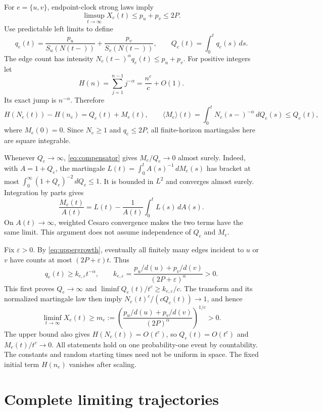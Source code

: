 \documentclass[11pt,a4paper]{article}
\begin{document}
For $e=\{u,v\}$, endpoint-clock strong laws imply
\begin{equation}\label{eq:uppergrowth}
 \limsup_{t\to\infty}X_e(t)\leq p_u+p_v\leq2P.
\end{equation}
Use predictable left limits to define
\[
 q_e(t)=\frac{p_u}{S_u(N(t-))}+\frac{p_v}{S_v(N(t-))},\qquad
 Q_e(t)=\int_0^t q_e(s)\,ds.
\]
The edge count has intensity $N_e(t-)^\alpha q_e(t)\leq p_u+p_v$.
For positive integers let
\[
 H(n)=\sum_{j=1}^{n-1}j^{-\alpha}=\frac{n^c}{c}+O(1).
\]
Its exact jump is $n^{-\alpha}$. Therefore
\begin{equation}\label{eq:compensator}
 H(N_e(t))-H(n_e)=Q_e(t)+M_e(t),\qquad
 \langle M_e\rangle(t)=\int_0^t N_e(s-)^{-\alpha}\,dQ_e(s)\leq Q_e(t),
\end{equation}
where $M_e(0)=0$. Since $N_e\geq1$ and $q_e\leq2P$, all finite-horizon
martingales here are square integrable.

Whenever $Q_e\to\infty$, \eqref{eq:compensator} gives $M_e/Q_e\to0$ almost
surely. Indeed, with $A=1+Q_e$, the martingale
$L(t)=\int_0^t A(s)^{-1}\,dM_e(s)$ has bracket at most
$\int_0^\infty(1+Q_e)^{-2}\,dQ_e\leq1$. It is bounded in $L^2$ and converges
almost surely. Integration by parts gives
\[
 \frac{M_e(t)}{A(t)}=L(t)-\frac{1}{A(t)}\int_0^t L(s)\,dA(s).
\]
On $A(t)\to\infty$, weighted Cesaro convergence makes the two terms have the
same limit. This argument does not assume independence of $Q_e$ and $M_e$.

Fix $\varepsilon>0$. By \eqref{eq:uppergrowth}, eventually all finitely many
edges incident to $u$ or $v$ have counts at most $(2P+\varepsilon)t$. Thus
\[
 q_e(t)\geq k_{e,\varepsilon}t^{-\alpha},\qquad
 k_{e,\varepsilon}=\frac{p_u/d(u)+p_v/d(v)}{(2P+\varepsilon)^\alpha}>0.
\]
This first proves $Q_e\to\infty$ and
$\liminf Q_e(t)/t^c\geq k_{e,\varepsilon}/c$. The transform and its normalized
martingale law then imply $N_e(t)^c/(cQ_e(t))\to1$, and hence
\begin{equation}\label{eq:lowergrowth}
 \liminf_{t\to\infty}X_e(t)\geq
 m_e:=\left(\frac{p_u/d(u)+p_v/d(v)}{(2P)^\alpha}\right)^{1/c}>0.
\end{equation}
The upper bound also gives $H(N_e(t))=O(t^c)$, so $Q_e(t)=O(t^c)$ and
$M_e(t)/t^c\to0$. All statements hold on one probability-one event by
countability. The constants and random starting times need not be uniform in
space. The fixed initial term $H(n_e)$ vanishes after scaling.

\section{Complete limiting trajectories}
\end{document}
